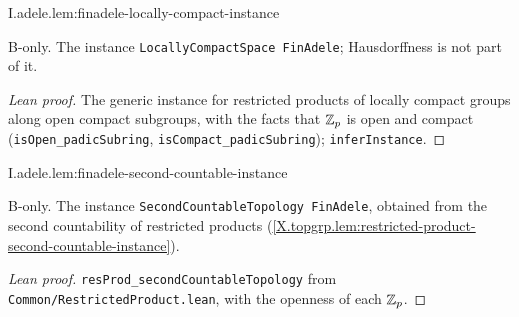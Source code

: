 \begin{lemma}
\bonly
{}
\end{lemma}
\begin{tfformal}{I.adele.lem:finadele-locally-compact-instance}
\begin{tffidelity}
B-only. The instance \texttt{LocallyCompactSpace FinAdele}; Hausdorffness is not part of it.
\end{tffidelity}
\end{tfformal}
\begin{proof}[Lean proof]
The generic instance for restricted products of locally compact groups along open compact subgroups, with the facts that $\mathbb{Z}_p$ is open and compact (\texttt{isOpen\_padicSubring}, \texttt{isCompact\_padicSubring}); \texttt{inferInstance}.
\end{proof}

\begin{lemma}
\bonly
{}
\end{lemma}
\begin{tfformal}{I.adele.lem:finadele-second-countable-instance}
\begin{tffidelity}
B-only. The instance \texttt{SecondCountableTopology FinAdele}, obtained from the second countability of restricted products (\cref{X.topgrp.lem:restricted-product-second-countable-instance}).
\end{tffidelity}
\end{tfformal}
\begin{proof}[Lean proof]
\texttt{resProd\_secondCountableTopology} from \texttt{Common/RestrictedProduct.lean}, with the openness of each $\mathbb{Z}_p$.
\end{proof}

